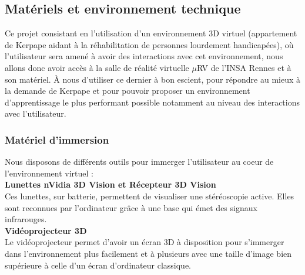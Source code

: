 \subsection{Matériels et environnement technique}

Ce projet consistant en l'utilisation d'un environnement 3D virtuel (appartement de Kerpape aidant à la réhabilitation de personnes lourdement handicapées), où l'utilisateur sera amené à avoir des interactions avec cet environnement, nous allons donc avoir accès à la salle de réalité virtuelle $\mu$RV de l'INSA Rennes et à son matériel. \`A nous d'utiliser ce dernier à bon escient, pour répondre au mieux à la demande de Kerpape et pour pouvoir proposer un environnement d'apprentissage le plus performant possible notamment au niveau des interactions avec l'utilisateur.

\subsubsection{Matériel d'immersion}
Nous disposons de différents outils pour immerger l'utilisateur au coeur de l'environnement virtuel :
\\

\textbf{Lunettes nVidia 3D Vision et Récepteur 3D Vision}
\\

Ces lunettes, sur batterie, permettent de visualiser une stéréoscopie active. Elles sont reconnues par l'ordinateur grâce à une base qui émet des signaux infrarouges.
\\

\textbf{Vidéoprojecteur 3D}
\\

Le vidéoprojecteur permet d'avoir un écran 3D à disposition pour s'immerger dans l'environnement plus facilement et à plusieurs avec une taille d'image bien supérieure à celle d'un écran d'ordinateur classique.
\\



